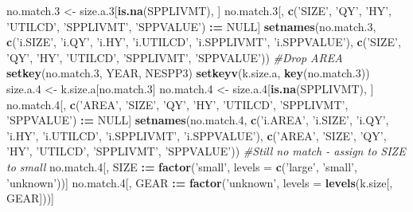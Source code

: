 \documentclass[]{article}
\newenvironment{Shaded}{\begin{snugshade}}{\end{snugshade}}
\newcommand{\KeywordTok}[1]{\textcolor[rgb]{0.13,0.29,0.53}{\textbf{#1}}}
\newcommand{\DataTypeTok}[1]{\textcolor[rgb]{0.13,0.29,0.53}{#1}}
\newcommand{\DecValTok}[1]{\textcolor[rgb]{0.00,0.00,0.81}{#1}}
\newcommand{\StringTok}[1]{\textcolor[rgb]{0.31,0.60,0.02}{#1}}
\newcommand{\CommentTok}[1]{\textcolor[rgb]{0.56,0.35,0.01}{\textit{#1}}}
\newcommand{\OtherTok}[1]{\textcolor[rgb]{0.56,0.35,0.01}{#1}}
\newcommand{\OperatorTok}[1]{\textcolor[rgb]{0.81,0.36,0.00}{\textbf{#1}}}
\newcommand{\ErrorTok}[1]{\textcolor[rgb]{0.64,0.00,0.00}{\textbf{#1}}}
\newcommand{\NormalTok}[1]{#1}
\begin{document}
\begin{Shaded}
\begin{Highlighting}[]
\NormalTok{  no.match.}\DecValTok{3}\NormalTok{ <-}\StringTok{ }\NormalTok{size.a.}\DecValTok{3}\NormalTok{[}\KeywordTok{is.na}\NormalTok{(SPPLIVMT), ]}
\NormalTok{  no.match.}\DecValTok{3}\NormalTok{[, }\KeywordTok{c}\NormalTok{(}\StringTok{'SIZE'}\NormalTok{, }\StringTok{'QY'}\NormalTok{, }\StringTok{'HY'}\NormalTok{, }\StringTok{'UTILCD'}\NormalTok{, }\StringTok{'SPPLIVMT'}\NormalTok{, }\StringTok{'SPPVALUE'}\NormalTok{) }\OperatorTok{:}\ErrorTok{=}\StringTok{ }\OtherTok{NULL}\NormalTok{]}
  \KeywordTok{setnames}\NormalTok{(no.match.}\DecValTok{3}\NormalTok{, }\KeywordTok{c}\NormalTok{(}\StringTok{'i.SIZE'}\NormalTok{, }\StringTok{'i.QY'}\NormalTok{, }\StringTok{'i.HY'}\NormalTok{, }\StringTok{'i.UTILCD'}\NormalTok{, }\StringTok{'i.SPPLIVMT'}\NormalTok{, }\StringTok{'i.SPPVALUE'}\NormalTok{), }
                       \KeywordTok{c}\NormalTok{(}\StringTok{'SIZE'}\NormalTok{,   }\StringTok{'QY'}\NormalTok{,   }\StringTok{'HY'}\NormalTok{,  }\StringTok{'UTILCD'}\NormalTok{,  }\StringTok{'SPPLIVMT'}\NormalTok{, }\StringTok{'SPPVALUE'}\NormalTok{))}
  \CommentTok{#Drop AREA}
  \KeywordTok{setkey}\NormalTok{(no.match.}\DecValTok{3}\NormalTok{, YEAR, NESPP3)}
  \KeywordTok{setkeyv}\NormalTok{(k.size.a, }\KeywordTok{key}\NormalTok{(no.match.}\DecValTok{3}\NormalTok{))}
\NormalTok{  size.a.}\DecValTok{4}\NormalTok{ <-}\StringTok{ }\NormalTok{k.size.a[no.match.}\DecValTok{3}\NormalTok{]}
\NormalTok{  no.match.}\DecValTok{4}\NormalTok{ <-}\StringTok{ }\NormalTok{size.a.}\DecValTok{4}\NormalTok{[}\KeywordTok{is.na}\NormalTok{(SPPLIVMT), ]}
\NormalTok{  no.match.}\DecValTok{4}\NormalTok{[, }\KeywordTok{c}\NormalTok{(}\StringTok{'AREA'}\NormalTok{, }\StringTok{'SIZE'}\NormalTok{, }\StringTok{'QY'}\NormalTok{, }\StringTok{'HY'}\NormalTok{, }\StringTok{'UTILCD'}\NormalTok{, }\StringTok{'SPPLIVMT'}\NormalTok{, }\StringTok{'SPPVALUE'}\NormalTok{) }\OperatorTok{:}\ErrorTok{=}\StringTok{ }\OtherTok{NULL}\NormalTok{]}
  \KeywordTok{setnames}\NormalTok{(no.match.}\DecValTok{4}\NormalTok{, }\KeywordTok{c}\NormalTok{(}\StringTok{'i.AREA'}\NormalTok{, }\StringTok{'i.SIZE'}\NormalTok{, }\StringTok{'i.QY'}\NormalTok{, }\StringTok{'i.HY'}\NormalTok{, }\StringTok{'i.UTILCD'}\NormalTok{, }\StringTok{'i.SPPLIVMT'}\NormalTok{, }\StringTok{'i.SPPVALUE'}\NormalTok{), }
                       \KeywordTok{c}\NormalTok{(}\StringTok{'AREA'}\NormalTok{,   }\StringTok{'SIZE'}\NormalTok{,   }\StringTok{'QY'}\NormalTok{,   }\StringTok{'HY'}\NormalTok{,  }\StringTok{'UTILCD'}\NormalTok{,  }\StringTok{'SPPLIVMT'}\NormalTok{, }\StringTok{'SPPVALUE'}\NormalTok{))}
  \CommentTok{#Still no match - assign to SIZE to small}
\NormalTok{  no.match.}\DecValTok{4}\NormalTok{[, SIZE }\OperatorTok{:}\ErrorTok{=}\StringTok{ }\KeywordTok{factor}\NormalTok{(}\StringTok{'small'}\NormalTok{,   }\DataTypeTok{levels =} \KeywordTok{c}\NormalTok{(}\StringTok{'large'}\NormalTok{, }\StringTok{'small'}\NormalTok{, }\StringTok{'unknown'}\NormalTok{))]}
\NormalTok{  no.match.}\DecValTok{4}\NormalTok{[, GEAR }\OperatorTok{:}\ErrorTok{=}\StringTok{ }\KeywordTok{factor}\NormalTok{(}\StringTok{'unknown'}\NormalTok{, }\DataTypeTok{levels =} \KeywordTok{levels}\NormalTok{(k.size[, GEAR]))]}
  

\end{Highlighting}
\end{Shaded}
\end{document}

